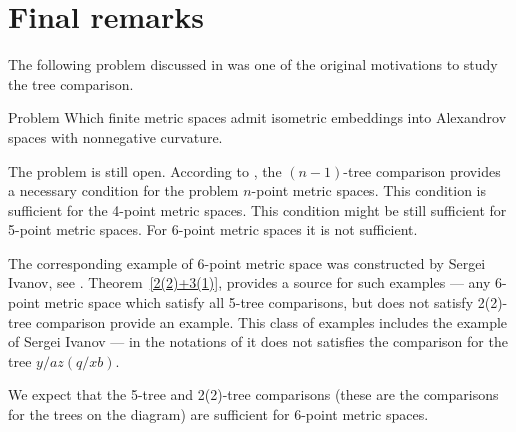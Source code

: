 \section{Final remarks}

The following problem discussed in \cite[7.1]{AKP} was one of the original motivations to study the tree comparison.

\begin{thm}{Problem}
Which finite metric spaces admit isometric embeddings into Alexandrov spaces with nonnegative curvature.
\end{thm}

The problem is still open.
According to \cite[4.1]{AKP}, the $(n-1)$-tree comparison provides a necessary condition for the problem $n$-point metric spaces.
This condition is sufficient for the 4-point metric spaces.
This condition might be still sufficient for 5-point metric spaces.
For 6-point metric spaces it is not sufficient.

The corresponding example of 6-point metric space was constructed by Sergei Ivanov, see \cite{AKP}.
Theorem~\ref{2(2)+3(1)}, provides a source for such examples --- any 6-point metric space which satisfy all 5-tree comparisons, but does not satisfy 2(2)-tree comparison provide an example.
This class of examples includes the example of Sergei Ivanov --- in the notations of \cite[7.1]{AKP} it does not satisfies the comparison for the tree $y/az(q/xb)$.

We expect that the 5-tree and 2(2)-tree comparisons (these are the comparisons for the trees on the diagram) are sufficient for 6-point metric spaces. 
\hide
\begin{center}
\hskip10mm

\end{center}
\unhide

